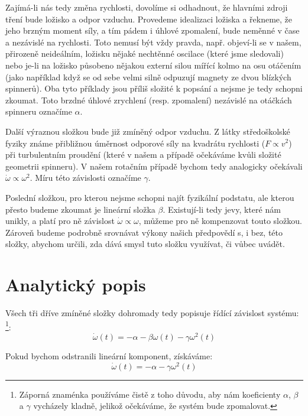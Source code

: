 \documentclass[12pt, a4paper,
 twoside,        %
 openright
]{report}
\begin{document}
Zajímá-li nás tedy změna rychlosti, dovolíme si odhadnout, že hlavními zdroji tření bude ložisko a odpor vzduchu. Provedeme idealizaci ložiska a řekneme, že jeho brzným moment síly, a tím pádem i úhlové zpomalení, bude neměnné v čase a nezávislé na rychlosti. Toto nemusí být vždy pravda, např. objeví-li se v našem, přirozeně neideálním, ložisku nějaké nechtěnné oscilace (které jsme sledovali) nebo je-li na ložisko působeno nějakou externí silou mířící kolmo na osu otáčením (jako například když se od sebe velmi silně odpuzují magnety ze dvou blízkých spinnerů). Oba tyto příklady jsou příliš složité k popsání a nejsme je tedy schopni zkoumat. Toto brzdné úhlové zrychlení (resp. zpomalení) nezávislé na otáčkách spinneru označíme $\alpha$.

Další výraznou složkou bude již zmíněný odpor vzduchu. Z látky středoškolské fyziky známe přibližnou úměrnost odporové síly na kvadrátu rychlosti ($F \propto v^2$) při turbulentním proudění (které v našem a případě očekáváme kvůli složité geometrii spinneru). V našem rotačním případě bychom tedy analogicky očekávali $\dot{\omega} \propto \omega^2$. Míru této závislosti označíme $\gamma$.

Poslední složkou, pro kterou nejsme schopni najít fyzikální podstatu, ale kterou přesto budeme zkoumat je lineární složka $\beta$. Existují-li tedy jevy, které nám unikly, a platí pro ně závislost $\dot{\omega} \propto \omega$, můžeme pro ně kompenzovat touto složkou. Zároveň budeme podrobně srovnávat výkony našich předpovědí s, i bez, této složky, abychom určili, zda dává smysl tuto složku využívat, či vůbec uvádět.

\clearpage

\section{Analytický popis}

Všech tři dříve zmíněné složky dohromady tedy popisuje řídící závislost systému: \footnote{Záporná znaménka používáme čistě z toho důvodu, aby nám koeficienty $\alpha$, $\beta$ a $\gamma$ vycházely kladně, jelikož očekáváme, že systém bude zpomalovat.}:
\begin{equation}
    \label{eq:drag_diff_wlin}
    \dot{\omega}(t) = - \alpha - \beta \omega(t) - \gamma \omega^2(t)
\end{equation}

Pokud bychom odstranili lineární komponent, získáváme:
\begin{equation}
    \label{eq:drag_diff}
    \dot{\omega}(t) = - \alpha - \gamma \omega^2(t)
\end{equation}
\end{document}
